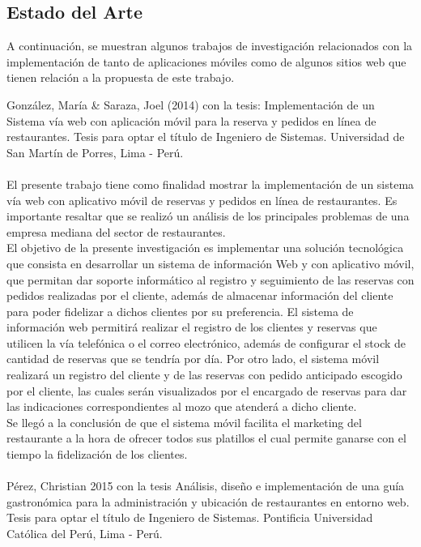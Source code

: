 \begin{large}
\section{Estado del Arte}

 A continuación, se muestran algunos trabajos de investigación relacionados con la implementación de tanto de aplicaciones móviles como de algunos sitios web que tienen relación a la propuesta de este trabajo.


González, María & Saraza, Joel (2014) con la tesis: Implementación de un Sistema vía web con aplicación móvil para la reserva y pedidos en línea de restaurantes. Tesis para optar el título de Ingeniero de Sistemas. Universidad de San Martín de Porres, Lima - Perú. 
\\
\\
El presente trabajo tiene como finalidad mostrar la implementación de un sistema vía web con aplicativo móvil de reservas y pedidos en línea de restaurantes. Es importante resaltar que se realizó un análisis de los principales problemas de una empresa mediana del sector de restaurantes.
\\
El objetivo de la presente investigación es implementar una solución tecnológica que consista en desarrollar un sistema de información Web y con aplicativo móvil, que permitan dar soporte informático al registro y seguimiento de las reservas con pedidos realizadas por el cliente, además de almacenar información del cliente para poder fidelizar a dichos clientes por su preferencia. El sistema de información web permitirá realizar el registro de los clientes y reservas que utilicen la vía telefónica o el correo electrónico, además de configurar el stock de cantidad de reservas que se tendría por día. Por otro lado, el sistema móvil realizará un registro del cliente y de las reservas con pedido anticipado escogido por el cliente, las cuales serán visualizados por el encargado de reservas para dar las indicaciones correspondientes al mozo que atenderá a dicho cliente. 
\\
Se llegó a la conclusión de que el sistema móvil facilita el marketing del restaurante a la hora de ofrecer todos sus platillos el cual permite ganarse con el tiempo la fidelización de los clientes. 
\\
\\
Pérez, Christian 2015 con la tesis Análisis, diseño e implementación de una guía gastronómica para la administración y ubicación de restaurantes en entorno web. Tesis para optar el título de Ingeniero de Sistemas. Pontificia Universidad Católica del Perú, Lima - Perú. 

\end{large}

